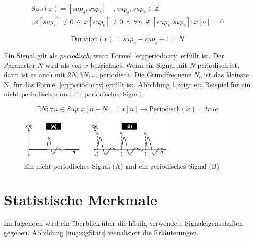 \begin{equation}
\label{eq:support}
\begin{split}
\text{Sup}(x) = [sup_s, sup_e] \quad , sup_s, sup_e \in \mathbb{Z} \\,  x[sup_s] \neq 0 \:  \wedge \:  x[sup_e] \neq 0 \: \wedge \: \forall n \
\not\in [sup_s, sup_e] : x[n] = 0
\end{split}
\end{equation}

\begin{equation}
\text{Duration}(x) = sup_e - sup_s + 1 = N
\label{eq:duration}
\end{equation}

Ein Signal gilt als \emph{periodisch}, wenn Formel \ref{eq:periodicity} erfüllt ist. Der Parameter $N$ wird als  von $x$ bezeichnet. Wenn ein Signal mit $N$ periodisch ist, dann ist es auch mit $2N, 3N, \ldots $ periodisch. Die Grundfrequenz $N_0$ ist das kleinste N, für das Formel \ref{eq:periodicity} erfüllt ist. Abbildung \ref{img:periodicSic} zeigt ein Beispiel für ein nicht-periodisches und ein periodisches Signal. \cite[S. 24]{dspMichigan}

\begin{equation}
\exists N : \forall n \in Sup : x[n+N] = x[n] \rightarrow \text{Periodisch}(x) = true
\label{eq:periodicity}
\end{equation}

\begin{figure}[h]
	\centering
	\includegraphics[width=0.7\textwidth]{bilder/periodicSig.png}
	\caption{Ein nicht-periodisches Signal (A) und ein periodisches Signal (B)}
	\label{img:periodicSic}
\end{figure}

\section{Statistische Merkmale}

Im folgenden wird ein überblick über die häufig verwendete Signaleigenschaften gegeben. Abbildung \ref{img:sigStats} visualisiert die Erläuterungen.

